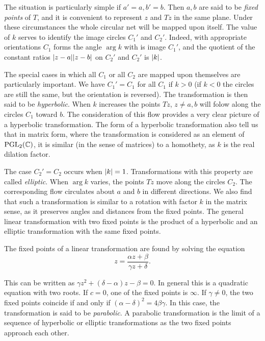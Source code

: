 The situation is particularly simple if $a'=a, b'=b$. Then $a,b$ are said to be \emph{fixed points} of $T$, and it is convenient to represent $z$ and $Tz$ in the same plane. Under these circumstances the whole circular net will be mapped upon itself. The value of $k$ serves to identify the image circles $C_1'$ and $C_2'$. Indeed, with appropriate orientations $C_1$ forms the angle $\arg k$ with is image $C_1'$, and the quotient of the constant ratios $\lvert z-a \rvert\lvert z-b \rvert$ on $C_2'$ and $C_2'$ is $\lvert k \rvert$.

The special cases in which all $C_1$ or all $C_2$ are mapped upon themselves are particularly important. We have $C_1'=C_1$ for all $C_1$ if $k>0$ (if $k<0$ the circles are still the same, but the orientation is reversed). The transformation is then said to be \emph{hyperbolic}. When $k$ increases the points $Tz$, $z \neq a,b$ will folow along the circles $C_1$ toward $b$. The consideration of this flow provides a very clear picture of a hyperbolic transformation. The form of a hyperbolic transformation also tell us that in matrix form, where the transformation is considered as an element of $\text{PGL}_2(\mathbb C)$, it is similar (in the sense of matrices) to a homothety, as $k$ is the real dilation factor.

The case $C_2'=C_2$ occurs when $\lvert k \rvert=1$. Transformations with this property are called \emph{elliptic}. When $\arg k$ varies, the points $Tz$ move along the circles $C_2$. The corresponding flow circulates about $a$ and $b$ in different directions. We also find that such a transformation is similar to a rotation with factor $k$ in the matrix sense, as it preserves angles and distances from the fixed points.
The general linear transformation with two fixed points is the product of a hyperbolic and an elliptic transformation with the same fixed points.

The fixed points of a linear transformation are found by solving the equation
\begin{equation}
	\label{eq:fixed-points}
	z=\dfrac{\alpha z+\beta}{\gamma z+\delta}.
\end{equation} 

This can be written as $\gamma z^2+(\delta-\alpha)z-\beta=0$.
In general this is a quadratic equation with two roots. If $c=0$, one of the fixed points is $\infty$. If $\gamma \neq 0$, the two fixed points coincide if and only if $(\alpha-\delta)^2=4\beta \gamma$. In this case, the transformation is said to be \emph{parabolic}. A parabolic transformation is the limit of a sequence of hyperbolic or elliptic transformations as the two fixed points approach each other.

